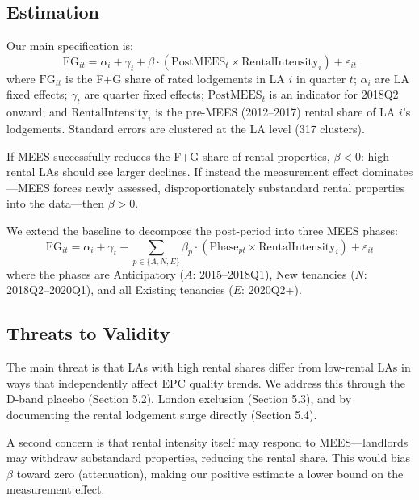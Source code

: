 \documentclass[12pt]{article}
\begin{document}
\subsection{Estimation}

Our main specification is:
\begin{equation}
\text{FG}_{it} = \alpha_i + \gamma_t + \beta \cdot (\text{PostMEES}_t \times \text{RentalIntensity}_i) + \varepsilon_{it}
\label{eq:main}
\end{equation}
where $\text{FG}_{it}$ is the F+G share of rated lodgements in LA $i$ in quarter $t$; $\alpha_i$ are LA fixed effects; $\gamma_t$ are quarter fixed effects; $\text{PostMEES}_t$ is an indicator for 2018Q2 onward; and $\text{RentalIntensity}_i$ is the pre-MEES (2012--2017) rental share of LA $i$'s lodgements. Standard errors are clustered at the LA level (317 clusters).

If MEES successfully reduces the F+G share of rental properties, $\beta < 0$: high-rental LAs should see larger declines. If instead the measurement effect dominates---MEES forces newly assessed, disproportionately substandard rental properties into the data---then $\beta > 0$.

We extend the baseline to decompose the post-period into three MEES phases:
\begin{equation}
\text{FG}_{it} = \alpha_i + \gamma_t + \sum_{p \in \{A, N, E\}} \beta_p \cdot (\text{Phase}_{pt} \times \text{RentalIntensity}_i) + \varepsilon_{it}
\end{equation}
where the phases are Anticipatory ($A$: 2015--2018Q1), New tenancies ($N$: 2018Q2--2020Q1), and all Existing tenancies ($E$: 2020Q2+).

\subsection{Threats to Validity}

The main threat is that LAs with high rental shares differ from low-rental LAs in ways that independently affect EPC quality trends. We address this through the D-band placebo (Section 5.2), London exclusion (Section 5.3), and by documenting the rental lodgement surge directly (Section 5.4).

A second concern is that rental intensity itself may respond to MEES---landlords may withdraw substandard properties, reducing the rental share. This would bias $\beta$ toward zero (attenuation), making our positive estimate a lower bound on the measurement effect.
\end{document}
